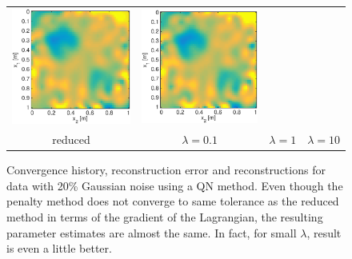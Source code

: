 \documentclass{iopart}
\begin{document}
\begin{figure}
\begin{tabular}{cccc}
\includegraphics[scale=.2]{./figs/2D_exp4_h}&
\includegraphics[scale=.2]{./figs/2D_exp4_i}\\
{\small reduced}&{\small $\lambda=0.1$}&{\small $\lambda=1$}&{\small $\lambda=10$}\\
\end{tabular}
\caption{Convergence history, reconstruction error and reconstructions for data with 20\% Gaussian noise using a QN method. Even though the penalty method does not converge to same tolerance as the reduced method in terms of the gradient of the Lagrangian, the resulting parameter estimates are almost the same. In fact, for small $\lambda$, result is even a little better.}
\label{fig:2D_exp4}
\end{figure}
\end{document}
